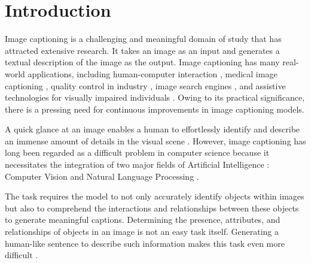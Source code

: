 \documentclass[conference]{IEEEtran}
\begin{document}
\section{Introduction}
Image captioning is a challenging and meaningful domain of study that has attracted extensive research. It takes an image as an input and generates a textual description of the image as the output. Image captioning has many real-world applications, including human-computer interaction \cite{li2020oscar, zhang2021vinvl}, medical image captioning \cite{huang2021contextualized, karoly2006psychological}, quality control in industry \cite{luo2019visual}, image search engines \cite{iyer2019image}, and assistive technologies for visually impaired individuals \cite{dognin2020image, kim2021proceedings, yu2023quality}. Owing to its practical significance, there is a pressing need for continuous improvements in image captioning models.


A quick glance at an image enables a human to effortlessly identify and describe an immense amount of details in the visual scene \cite{fei2007we}. However, image captioning has long been regarded as a difficult problem in computer science because it necessitates the integration of two major fields of Artificial Intelligence \cite{rinaldi2023automatic}: Computer Vision \cite{ijjina2016hybrid, wang2015feedforward} and Natural Language Processing \cite{cho2014learning, collobert2008unified}. 


The task requires the model to not only accurately identify objects within images but also to comprehend the interactions and relationships between these objects to generate meaningful captions. Determining the presence, attributes, and relationships of objects in an image is not an easy task itself. Generating a human-like sentence to describe such information makes this task even more difficult \cite{bai2018survey}.


\end{document}
